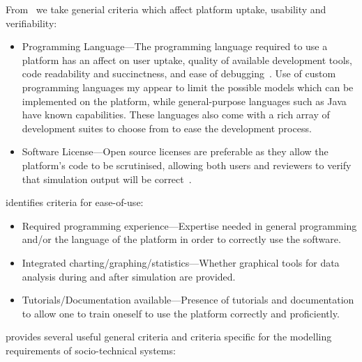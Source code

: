 From~\citet{CynthiaNikolaiandGregoryMadey2009} we take generial criteria which affect platform uptake, usability and verifiability:

\begin{itemize}
\item Programming Language---The programming language required to use a platform has an affect on user uptake, quality of available development tools, code readability and succinctness, and ease of debugging~\citep{Railsback2006}. Use of custom programming languages my appear to limit the possible models which can be implemented on the platform, while general-purpose languages such as Java have known capabilities. These languages also come with a rich array of development suites to choose from to ease the development process.
\item Software License---Open source licenses are preferable as they allow the platform's code to be scrutinised, allowing both users and reviewers to verify that simulation output will be correct~\citep{Polhill2007}.
\end{itemize}

\citet{Castle2006} identifies criteria for ease-of-use:

\begin{itemize}
\item Required programming experience---Expertise needed in general programming and/or the language of the platform in order to correctly use the software.
\item Integrated charting/graphing/statistics---Whether graphical tools for data analysis during and after simulation are provided.
\item Tutorials/Documentation available---Presence of tutorials and documentation to allow one to train oneself to use the platform correctly and proficiently.
\end{itemize}

\citet{Tobias2004} provides several useful general criteria and criteria specific for the modelling requirements of socio-technical systems:

